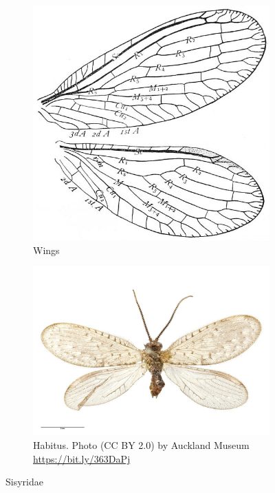 \documentclass[letterpaper, 11pt]{article}
\begin{document}
\begin{figure}[ht!]
    \centering
    \begin{subfigure}[ht!]{0.45\textwidth}
      \centering
        \includegraphics[width=\textwidth]{figures/sisyridWings.jpg}
        \caption{Wings \citep[][Fig. 328]{bhl29907}}
        \label{fig:sisyrid}
    \end{subfigure}
    \qquad
    \begin{subfigure}[ht!]{0.45\textwidth}
        \includegraphics[width=\textwidth]{figures/sisyridHabitus}
        \caption{Habitus. Photo (CC BY 2.0) by Auckland Museum \url{https://bit.ly/363DaPj}}
        \label{fig:sisyrid2}
    \end{subfigure}
    \caption{Sisyridae}\label{fig:sisyrids}
\end{figure}
\end{document}
